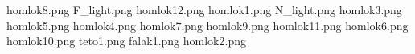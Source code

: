 homlok8.png
F_light.png
homlok12.png
homlok1.png
N_light.png
homlok3.png
homlok5.png
homlok4.png
homlok7.png
homlok9.png
homlok11.png
homlok6.png
homlok10.png
teto1.png
falak1.png
homlok2.png
